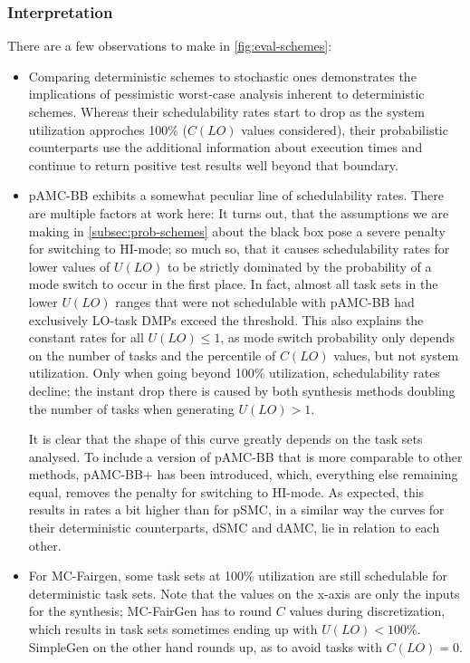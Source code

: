 \documentclass[a4paper,oneside]{csthesis}
\begin{document}
\subsubsection{Interpretation}
There are a few observations to make in \cref{fig:eval-schemes}:
\begin{itemize}
    
    \item Comparing deterministic schemes to stochastic ones demonstrates the implications of pessimistic worst-case analysis inherent to deterministic schemes. Whereas their schedulability rates start to drop as the system utilization approches 100\% ($C(LO)$ values considered), their probabilistic counterparts use the additional information about execution times and continue to return positive test results well beyond that boundary.

    \item pAMC-BB exhibits a somewhat peculiar line of schedulability rates. There are multiple factors at work here: It turns out, that the assumptions we are making in \cref{subsec:prob-schemes} about the black box pose a severe penalty for switching to HI-mode; so much so, that it causes schedulability rates for lower values of $U(LO)$ to be strictly dominated by the probability of a mode switch to occur in the first place. In fact, almost all task sets in the lower $U(LO)$ ranges that were not schedulable with pAMC-BB had exclusively LO-task DMPs exceed the threshold. This also explains the constant rates for all $U(LO) \leq 1$, as mode switch probability only depends on the number of tasks and the percentile of $C(LO)$ values, but not system utilization. Only when going beyond 100\% utilization, schedulability rates decline; the instant drop there is caused by both synthesis methods doubling the number of tasks when generating $U(LO) > 1$.
    
    It is clear that the shape of this curve greatly depends on the task sets analysed. To include a version of pAMC-BB that is more comparable to other methods, pAMC-BB+ has been introduced, which, everything else remaining equal, removes the penalty for switching to HI-mode. As expected, this results in rates a bit higher than for pSMC, in a similar way the curves for their deterministic counterparts, dSMC and dAMC, lie in relation to each other.

    \item For MC-Fairgen, some task sets at 100\% utilization are still schedulable for deterministic task sets. Note that the values on the x-axis are only the inputs for the synthesis; MC-FairGen has to round $C$ values during discretization, which results in task sets sometimes ending up with $U(LO) < 100\%$. SimpleGen on the other hand rounds up, as to avoid tasks with $C(LO) = 0$.
\end{itemize}
\end{document}
